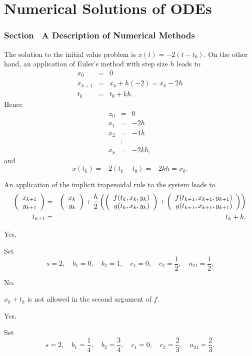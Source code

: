 \chapter{Numerical Solutions of ODEs}

\subsection*{Section~\protect{\ref{sec:DNM}} A Description of Numerical Methods}

 The solution to the initial value problem is
$x(t)=-2(t-t_0)$.  On the other hand, an application of Euler's method
with step size $h$ leads to
\[
\begin{array}{rcl}
x_0 & = & 0 \\
x_{k+1} & = & x_k + h (-2) = x_k - 2h\\
t_k & = & t_0 + kh.
\end{array}
\]
Hence
\[
\begin{array}{rcl}
x_0 & = & 0\\
x_1 & = & -2h\\
x_2 & = & -4h\\
 & \vdots & \\
x_k & = & -2kh,
\end{array}
\]
and
\[
x(t_k) = -2(t_k-t_0) = -2kh = x_k.
\]

 An application of the implicit trapezoidal rule to
the system  leads to
\begin{eqnarray*}
\left(\begin{array}{r} x_{k+1} \\ y_{k+1}\end{array}\right) & = &  \left(\begin{array}{r} x_k \\ y_k\end{array}\right) +
\frac{h}{2} \left(\left(\begin{array}{r} f(t_k,x_k,y_k) \\ g(t_k,x_k,y_k)\end{array}\right)
+\left(\begin{array}{r} f(t_{k+1},x_{k+1},y_{k+1}) \\ g(t_{k+1},x_{k+1},y_{k+1})\end{array}\right)\right)\\
t_{k+1} &=& t_k + h.
\end{eqnarray*}



 \ans Yes.

\soln Set
\[
s=2,\quad b_1=0,\quad b_2=1,\quad c_1=0,\quad c_2=\frac{1}{2},\quad
a_{21}=\frac{1}{2}.
\]

\newpage
{} \ans No.

\soln $x_k+t_k$ is not allowed in the second argument of $f$.

 \ans Yes.

\soln Set
\[
s=2,\quad b_1=\frac{1}{4},\quad b_2=\frac{3}{4},\quad
c_1=0,\quad c_2=\frac{2}{3},\quad a_{21}=\frac{2}{3}.
\]

